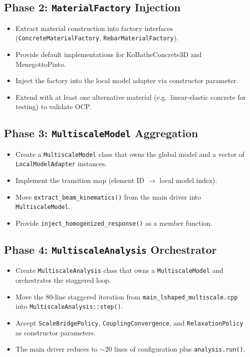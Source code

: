 \subsection{Phase 2: \texttt{MaterialFactory} Injection}
\label{sec:ms-plan-phase2}

\begin{itemize}
  \item Extract material construction into factory interfaces
    (\texttt{ConcreteMaterialFactory},
    \texttt{RebarMaterialFactory}).
  \item Provide default implementations for KoBatheConcrete3D and
    MenegottoPinto.
  \item Inject the factory into the local model adapter via
    constructor parameter.
  \item Extend with at least one alternative material (e.g.\
    linear-elastic concrete for testing) to validate OCP.
\end{itemize}

\subsection{Phase 3: \texttt{MultiscaleModel} Aggregation}
\label{sec:ms-plan-phase3}

\begin{itemize}
  \item Create a \texttt{MultiscaleModel} class that owns the global
    model and a vector of \texttt{LocalModelAdapter} instances.
  \item Implement the transition map (element ID $\to$ local model
    index).
  \item Move \texttt{extract\_beam\_kinematics()} from the main
    driver into \texttt{MultiscaleModel}.
  \item Provide \texttt{inject\_homogenized\_response()} as a
    member function.
\end{itemize}

\subsection{Phase 4: \texttt{MultiscaleAnalysis} Orchestrator}
\label{sec:ms-plan-phase4}

\begin{itemize}
  \item Create \texttt{MultiscaleAnalysis} class that owns a
    \texttt{MultiscaleModel} and orchestrates the staggered loop.
  \item Move the 80-line staggered iteration from
    \texttt{main\_lshaped\_multiscale.cpp} into
    \texttt{MultiscaleAnalysis::step()}.
  \item Accept \texttt{ScaleBridgePolicy}, \texttt{CouplingConvergence},
    and \texttt{RelaxationPolicy} as constructor parameters.
  \item The main driver reduces to ${\sim}20$ lines of configuration
    plus \texttt{analysis.run()}.
\end{itemize}

